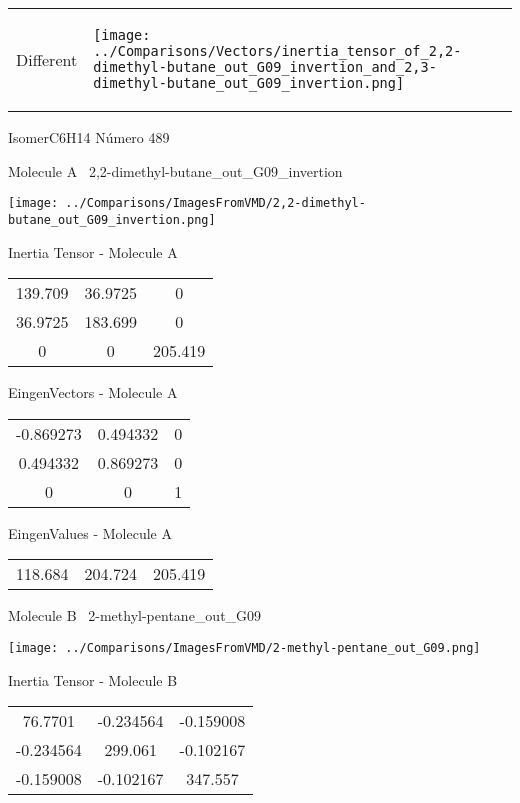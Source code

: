\vtab[-5mm]
\begin{tabular}{*{2}{m{}}}
\begin{center}
\textcolor{NavyBlue}{\Large Different}
\end{center}
&
\begin{center}
\texttt{[image: ../Comparisons/Vectors/inertia\_tensor\_of\_2,2-dimethyl-butane\_out\_G09\_invertion\_and\_2,3-dimethyl-butane\_out\_G09\_invertion.png]}
\end{center}
\end{tabular}

 \newpage

\vtab[-3cm]
\begin{center}
{\large IsomerC6H14 \tab Número 489}
\end{center}
\begin{multicols}{2}
\begin{center}

Molecule A \
2,2-dimethyl-butane\_out\_G09\_invertion

\texttt{[image: ../Comparisons/ImagesFromVMD/2,2-dimethyl-butane\_out\_G09\_invertion.png]}

Inertia Tensor - Molecule A \\
\begin{tabular}{|c c c|}
139.709	 & 	36.9725	 & 	0	 \\
36.9725	 & 	183.699	 & 	0	 \\
0	 & 	0	 & 	205.419
\end{tabular}

\vtab
 EingenVectors - Molecule A     \\
\begin{tabular}{|c c c|}
-0.869273	 & 	0.494332	 & 	0	 \\
0.494332	 & 	0.869273	 & 	0	 \\
0	 & 	0	 & 	1
\end{tabular}

\vtab
 EingenValues - Molecule A     \\
\begin{tabular}{|c c c|}
118.684	 & 	204.724	 & 	205.419	 \\
\end{tabular}
\columnbreak

Molecule B \
2-methyl-pentane\_out\_G09

\texttt{[image: ../Comparisons/ImagesFromVMD/2-methyl-pentane\_out\_G09.png]}

Inertia Tensor - Molecule B \\
\begin{tabular}{|c c c|}
76.7701	 & 	-0.234564	 & 	-0.159008	 \\
-0.234564	 & 	299.061	 & 	-0.102167	 \\
-0.159008	 & 	-0.102167	 & 	347.557
\end{tabular}


\end{center}
\end{multicols}
